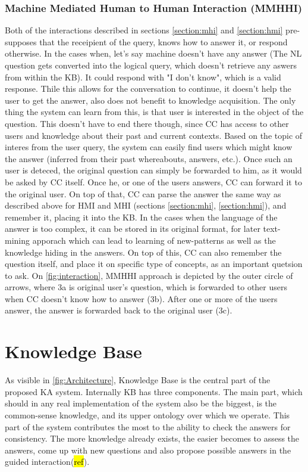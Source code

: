 \subsubsection{Machine Mediated Human to Human Interaction (MMHHI)}
\label{section:mmhhi}
Both of the interactions described in sections \ref{section:mhi} and 
\ref{section:hmi} pre-supposes that the receipient of the query, knows how to
answer it, or respond otherwise. In the cases when, let's say machine doesn't
have any answer (The NL question gets converted into the logical query, which doesn't retrieve any aswers from within the KB). It could respond with 
"I don't know", which is a valid response.
Thile this allows for the conversation to continue, it doesn't help the user
to get the answer, also does not benefit to knowledge acquisition. The only 
thing the system can learn from this, is that user is interested in the object
of the question. This doesn't have to end there though, since CC has access to
other users and knowledge about their past and current contexts. Based on the
topic of interes from the user query, the system can easily find users which
might know the answer (inferred from their past whereabouts, answers, etc.).
Once such an user is deteced, the original question can simply be forwarded to
him, as it would be asked by CC itself. Once he, or one of the users answers,
CC can forward it to the original user. On top of that, CC can parse the answer
the same way as described above for HMI and MHI (sections \ref{section:mhi},
\ref{section:hmi}), and remember it, placing it into the KB. In the cases when
the language of the answer is too complex, it can be stored in its original
format, for later text-mining apporach which can lead to learning of new-patterns
as well as the knowledge hiding in the answers. On top of this, CC can also
remember the question itself, and place it on specific type of concepts, as an
important quetsion to ask. On \autoref{fig:interaction},
MMHHI approach is depicted by the outer circle of arrows, where 3a is original 
user's question, which is forwarded to other users when CC doesn't know how to 
answer (3b). After one or more of the users answer, the answer is forwarded back
to the original user (3c).

\section{Knowledge Base}
As visible in \autoref{fig:Architecture}, Knowledge Base is the central part
of the proposed KA system. Internally KB has three components. The main part, 
which should in any real implementation of the system also be the biggest, is 
the common-sense knowledge, and its upper ontology over which we operate. 
This part of the system contributes the most to the ability to check the 
answers for consistency. The more knowledge already exists, the easier becomes 
to assess the answers, come up with new questions and also propose possible
answers in the guided interaction(\hl{ref}).

